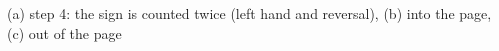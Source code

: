 (a) step 4: the sign is counted twice (left hand and reversal), (b) into the page, (c) out of the page
